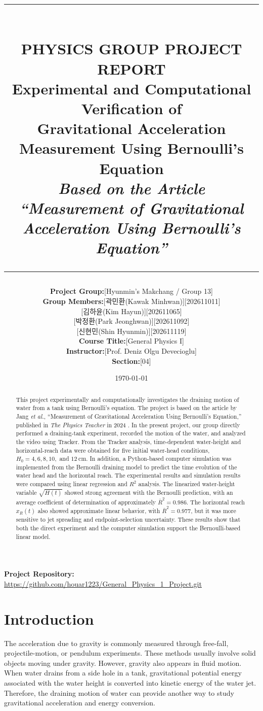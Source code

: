 \documentclass[11pt,letterpaper]{article}
\title{
\vspace{-1.5in}
\rule{\linewidth}{1.5pt} \\ \vspace{4mm}
\large\textbf{PHYSICS GROUP PROJECT REPORT} \\ \vspace{2mm}
\Large\textbf{Experimental and Computational Verification of \\ 
Gravitational Acceleration Measurement Using Bernoulli's Equation}
\\ \vspace{4mm}
\large\textit{Based on the Article ``Measurement of Gravitational Acceleration Using Bernoulli's Equation''} \\
\rule{\linewidth}{1.5pt}
}
\author{
\begin{tabular}{r @{\quad} p{5.0cm} @{\quad} l}
\textbf{Project Group:} & \multicolumn{2}{l}{[Hyunmin's Makchang / Group 13]} \\[1ex]
\textbf{Group Members:} 
& [곽민환(Kawak Minhwan)] & [202611011] \\
& [김하윤(Kim Hayun)] & [202611065] \\
& [박정환(Park Jeonghwan)] & [202611092] \\
& [신현민(Shin Hyunmin)] & [202611119] \\[1ex]
\textbf{Course Title:} & \multicolumn{2}{l}{[General Physics I]} \\
\textbf{Instructor:} & \multicolumn{2}{l}{[Prof. Deniz Olgu Devecioglu]} \\
\textbf{Section:} & \multicolumn{2}{l}{[04]}
\end{tabular}
}
\date{\today}
\begin{document}
\maketitle

\begin{abstract}
This project experimentally and computationally investigates the draining motion of water from a tank using Bernoulli's equation. The project is based on the article by Jang \textit{et al.}, ``Measurement of Gravitational Acceleration Using Bernoulli's Equation,'' published in \textit{The Physics Teacher} in 2024 \cite{jang2024}. In the present project, our group directly performed a draining-tank experiment, recorded the motion of the water, and analyzed the video using Tracker. From the Tracker analysis, time-dependent water-height and horizontal-reach data were obtained for five initial water-head conditions, $H_0=4,6,8,10,$ and $12~\mathrm{cm}$. In addition, a Python-based computer simulation was implemented from the Bernoulli draining model to predict the time evolution of the water head and the horizontal reach. The experimental results and simulation results were compared using linear regression and $R^2$ analysis. The linearized water-height variable $\sqrt{H(t)}$ showed strong agreement with the Bernoulli prediction, with an average coefficient of determination of approximately $\bar{R}^2=0.986$. The horizontal reach $x_R(t)$ also showed approximate linear behavior, with $\bar{R}^2=0.977$, but it was more sensitive to jet spreading and endpoint-selection uncertainty. These results show that both the direct experiment and the computer simulation support the Bernoulli-based linear model.
\end{abstract}

\begin{center}
\textbf{Project Repository:} \\
\url{https://github.com/houar1223/General_Physics_1_Project.git}
\end{center}

\newpage
\tableofcontents
\newpage

\section{Introduction}

The acceleration due to gravity is commonly measured through free-fall, projectile-motion, or pendulum experiments. These methods usually involve solid objects moving under gravity. However, gravity also appears in fluid motion. When water drains from a side hole in a tank, gravitational potential energy associated with the water height is converted into kinetic energy of the water jet. Therefore, the draining motion of water can provide another way to study gravitational acceleration and energy conversion.
\end{document}
